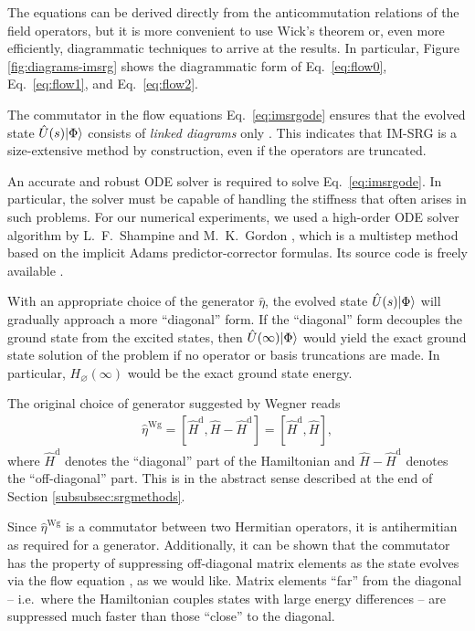 The equations can be derived directly from the anticommutation relations of the field operators, but it is more convenient to use Wick's theorem \cite{PhysRev.80.268} or, even more efficiently, diagrammatic techniques \cite{shavitt2009many} to arrive at the results.  In particular, Figure \ref{fig:diagrams-imsrg} shows the diagrammatic form of Eq.\ \eqref{eq:flow0}, Eq.\ \eqref{eq:flow1}, and Eq.\ \eqref{eq:flow2}.

The commutator in the flow equations Eq.\ \eqref{eq:imsrgode} ensures that the evolved state $\hat U(s) | \Phi \rangle$ consists of \emph{linked diagrams} only \cite{shavitt2009many}.  This indicates that IM-SRG is a size-extensive \cite{ISI:A1981MN73700014} method by construction, even if the operators are truncated.

An accurate and robust ODE solver is required to solve Eq.\ \eqref{eq:imsrgode}.  In particular, the solver must be capable of handling the stiffness that often arises in such problems.  For our numerical experiments, we used a high-order ODE solver algorithm by L.\ F.\ Shampine and M.\ K.\ Gordon \cite{shampine1975computer}, which is a multistep method based on the implicit Adams predictor-corrector formulas.  Its source code is freely available \cite{odesolver}.

With an appropriate choice of the generator $\hat{\eta}$, the evolved state $\hat U(s) | \Phi \rangle$ will gradually approach a more ``diagonal'' form.  If the ``diagonal'' form decouples the ground state from the excited states, then $\hat U(\infty) | \Phi \rangle$ would yield the exact ground state solution of the problem if no operator or basis truncations are made.  In particular, $H_\varnothing(\infty)$ would be the exact ground state energy.

The original choice of generator suggested by Wegner \cite{Wegner200177} reads
\begin{align*}
  \hat{\eta}^{\text{Wg}}
  = [\hat{H}^{\text{d}}, \hat{H} - \hat{H}^{\text{d}}]
  = [\hat{H}^{\text{d}}, \hat{H}],
\end{align*}
where $\hat{H}^{\text{d}}$ denotes the ``diagonal'' part of the Hamiltonian and $\hat{H} - \hat{H}^{\text{d}}$ denotes the ``off-diagonal'' part.  This is in the abstract sense described at the end of Section \ref{subsubsec:srgmethods}.

Since $\hat{\eta}^{\text{Wg}}$ is a commutator between two Hermitian operators, it is antihermitian as required for a generator.  Additionally, it can be shown that the commutator has the property of suppressing off-diagonal matrix elements as the state evolves via the flow equation \cite{kehrein2006flow}, as we would like.  Matrix elements ``far'' from the diagonal -- i.e.\ where the Hamiltonian couples states with large energy differences -- are suppressed much faster than those ``close'' to the diagonal.

